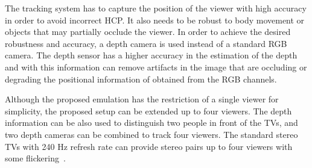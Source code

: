 The tracking system has to capture the position of the viewer with high accuracy in order to avoid incorrect HCP. It also needs to be robust to body movement or objects that may partially occlude the viewer. In order to achieve the desired robustness and accuracy, a depth camera is used instead of a standard RGB camera. The depth sensor has a higher accuracy in the estimation of the depth and with this information can remove artifacts in the image that are occluding or degrading the positional information of obtained from the RGB channels. 

Although the proposed emulation has the restriction of a single viewer for simplicity, the proposed setup can be extended up to four viewers. The depth information can be also used to distinguish two people in front of the TVs, and two depth cameras can be combined to track four viewers. The standard stereo TVs with 240 Hz refresh rate can provide stereo pairs up to four viewers with some flickering~\cite{Frohlich2005}. 






